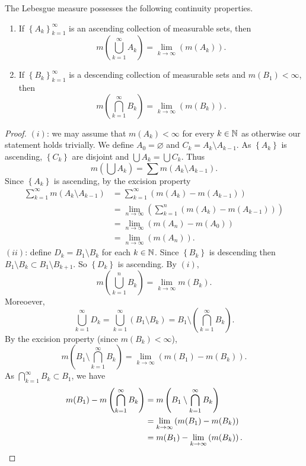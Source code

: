 \begin{theorem}[]
	The Lebesgue measure possesses the following continuity properties.
	\begin{enumerate}
		\item
		If
		$
			\left\{
				A_k
			\right\}_{k=1}^\infty
		$
		is an ascending collection of measurable sets, then
		\[
			m\left( 
				\bigcup_{k=1}^\infty A_k
			\right) = \lim_{k \to \infty} \left( 
				m(A_k) 
			\right).
		\] 

		\item
		If
		$
			\left\{
				B_k
			\right\}_{k=1}^\infty
		$
		is a descending collection of measurable sets and $m(B_1) < \infty$,
		then
		\[
			m\left( 
				\bigcap_{k=1}^\infty B_k 
			\right) = \lim_{k\to\infty} \left( 
				m(B_k) 
			\right).
		\]
	\end{enumerate}
\end{theorem}

\begin{proof}
	$(i)$: we may assume that $m(A_k) < \infty$ for every $k \in \mathbb{N}$ as
	otherwise our statement holds trivially.
	We define $A_0 = \varnothing$ and $C_k = A_k \setminus A_{k-1}$.
	As 
	$
		\left\{
			A_k
		\right\}
	$ 
	is ascending,
	$
		\left\{
			C_k
		\right\}
	$
	are disjoint and $\bigcup A_k = \bigcup C_k$.
	Thus
	\[
		m\left( 
			\bigcup A_k 
		\right) = \sum m \left( 
			A_k \setminus A_{k-1}
		\right).
	\]
	Since
	$
		\left\{
			A_k
		\right\}
	$
	is ascending, by the excision property
	\begin{align*}
		\sum^{\infty}_{k=1} m\left( 
			A_k \setminus A_{k-1} 
		\right)
		&= \sum^{\infty}_{k=1} \left( 
			m(A_k) - m(A_{k-1}) 
		\right) \\
		&= \lim_{n\to\infty} \left( 
			\sum^{n}_{k=1} \left( 
				m(A_k) - m(A_{k-1}) 
			\right) 
		\right) \\
		&= \lim_{n\to\infty} \left( 
			m(A_n) - m(A_0) 
		\right) \\
		&= \lim_{n\to\infty} \left( 
			m(A_n) 
		\right).
	\end{align*}
	$(ii)$:
	define $D_k = B_1 \setminus B_k$ for each $k \in \mathbb{N}$.
	Since
	$
		\left\{
			B_k
		\right\}
	$
	is descending then
	$
		B_1 \setminus B_k \subset B_1 \setminus B_{k+1}
	$.
	So
	$
		\left\{
			D_k
		\right\}
	$
	is ascending.
	By $(i)$,
	\[
		m\left( 
			\bigcup_{k=1}^n B_k 
		\right) = \lim_{k \to \infty} m(B_k).
	\]
	Moreoever,
	\[
		\bigcup_{k=1}^\infty D_k
		= \bigcup_{k=1}^\infty (B_1 \setminus B_k)
		= B_1 \setminus \left( 
			\bigcap_{k=1}^\infty B_k
		\right).
	\]
	By the excision property (since $m(B_k) < \infty$),
	\[
		m\left( 
			B_1 \setminus \bigcap_{k=1}^\infty B_k
		\right) = \lim_{k \to \infty}(m(B_1) - m(B_k)).
	\]
	As $\bigcap_{k=1}^\infty B_k \subset B_1$, we have
	\begin{align*}
		m(B_1) - m\left( 
			\bigcap_{k=1}^\infty B_k 
		\right)
		&= m\left( 
			B_1 \setminus \bigcap_{k=1}^\infty B_k 
		\right) \\
		&= \lim_{k \to \infty} \left( 
			m(B_1) - m(B_k) 
		\right) \\
		&= m(B_1) - \lim_{k\to\infty} \left( 
			m(B_k) 
		\right). \qedhere
	\end{align*}
\end{proof}
